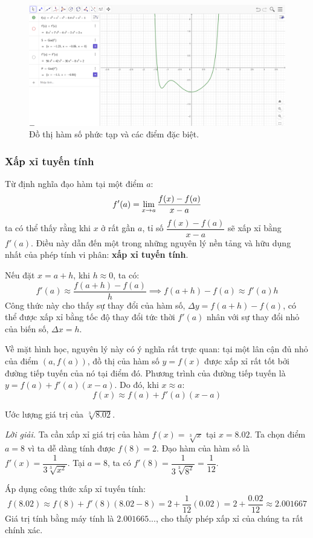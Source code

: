 \begin{figure}[H]
    \centering
    \includegraphics[width=1\textwidth]{figures/geogebra_Complex_Plot.png}
    \caption{Đồ thị hàm số phức tạp và các điểm đặc biệt.}
    \label{fig:geogebra-complex-plot}
\end{figure}

\subsubsection{Xấp xỉ tuyến tính}
\label{subsubsec:linear-approximation}

Từ định nghĩa đạo hàm tại một điểm $a$:
$$ f'(a) = \lim\limits_{x \to a} \dfrac{f(x) - f(a)}{x - a} $$
ta có thể thấy rằng khi $x$ ở rất gần $a$, tỉ số $\dfrac{f(x) - f(a)}{x - a}$ sẽ xấp xỉ bằng $f'(a)$. Điều này dẫn đến một trong những nguyên lý nền tảng và hữu dụng nhất của phép tính vi phân: \textbf{xấp xỉ tuyến tính}.

Nếu đặt $x = a+h$, khi $h \approx 0$, ta có:
$$ f'(a) \approx \dfrac{f(a+h) - f(a)}{h} \implies f(a+h) - f(a) \approx f'(a)h $$
Công thức này cho thấy sự thay đổi của hàm số, $\Delta y = f(a+h) - f(a)$, có thể được xấp xỉ bằng tốc độ thay đổi tức thời $f'(a)$ nhân với sự thay đổi nhỏ của biến số, $\Delta x = h$.

Về mặt hình học, nguyên lý này có ý nghĩa rất trực quan: tại một lân cận đủ nhỏ của điểm $(a, f(a))$, đồ thị của hàm số $y=f(x)$ được xấp xỉ rất tốt bởi đường tiếp tuyến của nó tại điểm đó. Phương trình của đường tiếp tuyến là $y = f(a) + f'(a)(x-a)$. Do đó, khi $x \approx a$:
$$ f(x) \approx f(a) + f'(a)(x-a) $$



\begin{example}
Ước lượng giá trị của $\sqrt[3]{8.02}$.

\textit{Lời giải.}
Ta cần xấp xỉ giá trị của hàm $f(x) = \sqrt[3]{x}$ tại $x=8.02$. Ta chọn điểm $a=8$ vì ta dễ dàng tính được $f(8)=2$.
Đạo hàm của hàm số là $f'(x) = \dfrac{1}{3\sqrt[3]{x^2}}$.
Tại $a=8$, ta có $f'(8) = \dfrac{1}{3\sqrt[3]{8^2}} = \dfrac{1}{12}$.

Áp dụng công thức xấp xỉ tuyến tính:
$$ f(8.02) \approx f(8) + f'(8)(8.02 - 8) = 2 + \dfrac{1}{12}(0.02) = 2 + \dfrac{0.02}{12} \approx 2.001667 $$
Giá trị tính bằng máy tính là $2.001665...$, cho thấy phép xấp xỉ của chúng ta rất chính xác.
\end{example}

